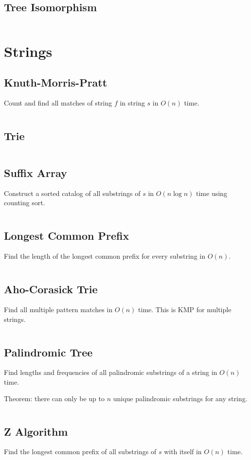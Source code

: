 \documentclass[8pt,a4paper,landscape,oneside]{amsart}
\newcommand{\code}[1]{\inputminted[fontsize=\normalsize,baselinestretch=1]{cpp}{_code/#1}}
\begin{document}
\begin{multicols*}{3}
  \subsection{Tree Isomorphism}
    \code{graphs/tree_isomorphism.cpp}
\section{Strings}
  \subsection{Knuth-Morris-Pratt}
    Count and find all matches of string $f$ in string $s$ in $O(n)$ time.
    \code{strings/kmp.cpp}
  \subsection{Trie}
    \code{strings/trie.cpp}
  \subsection{Suffix Array}
    Construct a sorted catalog of all substrings of $s$ in $O(n \log n)$ time using counting sort.
    \code{strings/suffix-array.cpp}
  \subsection{Longest Common Prefix}
    Find the length of the longest common prefix for every substring in $O(n)$.
    \code{strings/lcp.cpp}
  \subsection{Aho-Corasick Trie}
    Find all multiple pattern matches in $O(n)$ time. This is KMP for multiple strings.
    \code{strings/aho-corasick-trie.java}
  \subsection{Palindromic Tree}
    Find lengths and frequencies of all palindromic substrings of a string in $O(n)$ time.

    Theorem: there can only be up to $n$ unique palindromic substrings for any string.
    \code{strings/palindromic-tree.cpp}
  \subsection{Z Algorithm}
    Find the longest common prefix of all substrings of $s$ with itself in $O(n)$ time.
    \code{strings/z.cpp}

\end{multicols*}
\end{document}
